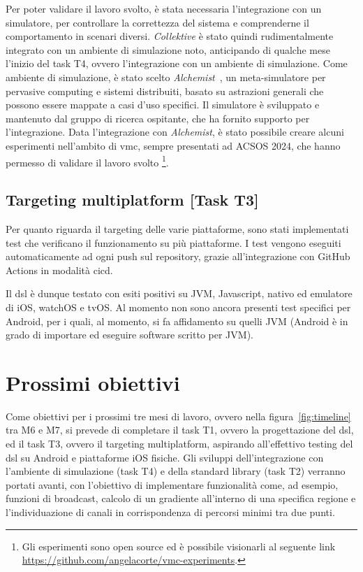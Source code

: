 \documentclass[13pt, a4paper]{article}
\newcommand{\ck}{\emph{Collektive}}
\begin{document}
Per poter validare il lavoro svolto, è stata necessaria l'integrazione con un simulatore,
    per controllare la correttezza del sistema e comprenderne il comportamento in scenari diversi.
%
\ck{} è stato quindi rudimentalmente integrato con un ambiente di simulazione noto,
anticipando di qualche mese l'inizio del task T4, ovvero l'integrazione con un ambiente di simulazione.
%
Come ambiente di simulazione, è stato scelto \emph{Alchemist}~\cite{PianiniJOS2013},
un meta-simulatore per pervasive computing e sistemi distribuiti,
basato su astrazioni generali che possono essere mappate a casi d'uso specifici.
%
Il simulatore è sviluppato e mantenuto dal gruppo di ricerca ospitante,
che ha fornito supporto per l'integrazione.
%
Data l'integrazione con \emph{Alchemist}, è stato possibile creare alcuni esperimenti nell'ambito di \ac{vmc},
    sempre presentati ad ACSOS 2024, che hanno permesso di validare il lavoro svolto \footnote{
    Gli esperimenti sono open source ed è possibile visionarli al seguente link \url{https://github.com/angelacorte/vmc-experiments}.
}.

\subsection{Targeting multiplatform [Task T3]}\label{subsec:task-t3-[targeting-multiplatform]}
Per quanto riguarda il targeting delle varie piattaforme,
    sono stati implementati test che verificano il funzionamento su più piattaforme.
%
I test vengono eseguiti automaticamente ad ogni push sul repository, grazie all'integrazione con GitHub Actions in modalità \ac{cicd}.

Il \ac{dsl} è dunque testato con esiti positivi su \ac{JVM}, Javascript, nativo ed emulatore di iOS, watchOS e tvOS.
%
Al momento non sono ancora presenti test specifici per Android,
per i quali, al momento,
si fa affidamento su quelli \ac{JVM}
(Android è in grado di importare ed eseguire software scritto per \ac{JVM}).

\section{Prossimi obiettivi}\label{sec:prossimi-obiettivi}


Come obiettivi per i prossimi tre mesi di lavoro, ovvero nella figura~\ref{fig:timeline} tra M6 e M7,
    si prevede di completare il task T1, ovvero la progettazione del \ac{dsl},
    ed il task T3, ovvero il targeting multiplatform,
    aspirando all'effettivo testing del \ac{dsl} su Android e piattaforme iOS fisiche.
%
Gli sviluppi dell'integrazione con l'ambiente di simulazione (task T4) e della standard library (task T2) verranno portati
avanti, con l'obiettivo di implementare funzionalità come, ad esempio, funzioni di broadcast,
calcolo di un gradiente all'interno di una specifica regione e l'individuazione di canali in corrispondenza di percorsi minimi tra due punti.
\end{document}

